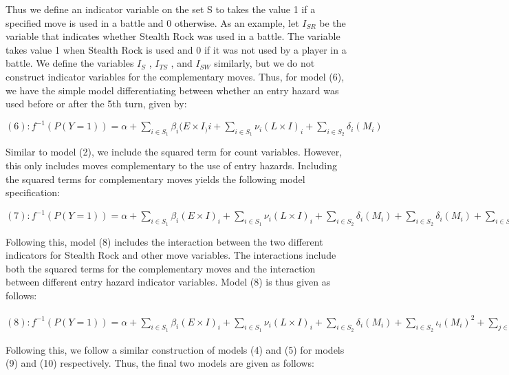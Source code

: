 \documentclass[12pt,twoside]{reedthesis}
\begin{document}
  Thus we define an indicator variable on the set S to takes the value 1
  if a specified move is used in a battle and 0 otherwise. As an example,
  let \(I_{SR}\) be the variable that indicates whether Stealth Rock was
  used in a battle. The variable takes value 1 when Stealth Rock is used
  and 0 if it was not used by a player in a battle. We define the
  variables \(I_S\) , \(I_{TS}\) , and \(I_{SW}\) similarly, but we do not
  construct indicator variables for the complementary moves. Thus, for
  model (6), we have the simple model differentiating between whether an
  entry hazard was used before or after the 5th turn, given by:
  
  \((6): f^{-1}(P(Y=1)) = \alpha + \sum_{i \in S_1} \beta_i(E \times I_)i+ \sum_{i \in S_1} \nu_i(L \times I)_i+ \sum_{i \in S_2} \delta_i(M_i)\)
  
  Similar to model (2), we include the squared term for count variables.
  However, this only includes moves complementary to the use of entry
  hazards. Including the squared terms for complementary moves yields the
  following model specification:
  
  \((7): f^{-1}(P(Y=1)) = \alpha + \sum_{i \in S_1} \beta_i(E \times I)_i+ \sum_{i \in S_1} \nu_i(L \times I)_i+ \sum_{i \in S_2} \delta_i(M_i) + \sum_{i \in S_2} \delta_i(M_i) + \sum_{i \in S_2} \iota_i(M_i)^2\)
  
  Following this, model (8) includes the interaction between the two
  different indicators for Stealth Rock and other move variables. The
  interactions include both the squared terms for the complementary moves
  and the interaction between different entry hazard indicator variables.
  Model (8) is thus given as follows:
  
  \((8): f^{-1}(P(Y=1)) = \alpha + \sum_{i \in S_1} \beta_i(E \times I)_i+ \sum_{i \in S_1} \nu_i(L \times I)_i+ \sum_{i \in S_2} \delta_i(M_i) + \sum_{i \in S_2} \iota_i(M_i)^2 + \sum_{j \in S_2}\theta_j((E \times I)_{SR} \times M_j) + \sum_{j \in S_2}\mu_j((L \times I)_{SR} \times M_j) + \sum_{j \in S_2} \lambda_j((E \times I)_{SR} \times (M_j)^2) + \sum_{j \in S_2} \epsilon_j((L \times I)_{SR} \times (M_j)^2) + \sum_{j \in S_1/SR} \chi_j((E \times I)_{SR} \times (E \times I)_j) + \sum_{j \in S_1/SR} \xi_j((E \times I)_{SR} \times (L \times I)_j) + \sum_{j \in S_1/SR} \psi_j((L \times I)_{SR} \times (E \times I)_j) + \sum_{j \in S_1/SR} \omega_j((L \times I)_{SR} \times (L \times I)_j)\)
  
  Following this, we follow a similar construction of models (4) and (5)
  for models (9) and (10) respectively. Thus, the final two models are
  given as follows:
  
\end{document}
